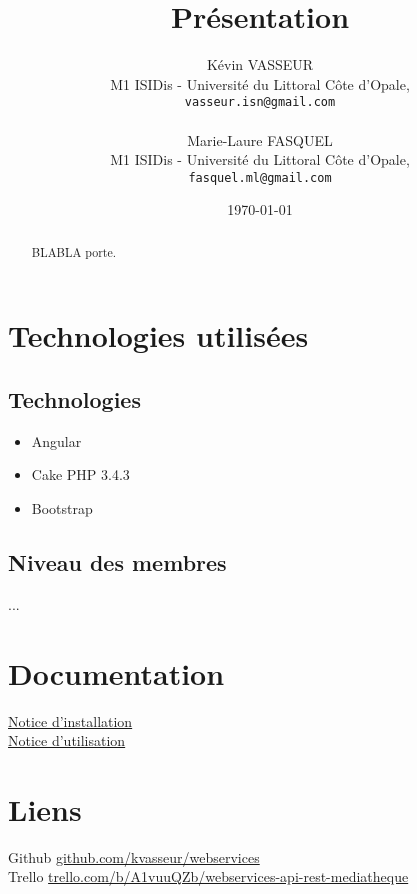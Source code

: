 \documentclass{article}
\title{Pr\'{e}sentation}
\author{K\'{e}vin VASSEUR\\
   M1 ISIDis - Universit\'{e} du Littoral C\^{o}te d'Opale,\\
   \texttt{vasseur.isn@gmail.com}\\
   \\
   Marie-Laure FASQUEL\\
   M1 ISIDis - Universit\'{e} du Littoral C\^{o}te d'Opale,\\
   \texttt{fasquel.ml@gmail.com}
}
\date{\today}
\begin{document}
	\maketitle
	\begin{abstract}
		BLABLA porte.
	\end{abstract}	
	\section{Technologies utilis\'{e}es}
		\subsection{Technologies}
			\begin{itemize}
				\item Angular
				\item Cake PHP 3.4.3
				\item Bootstrap
			\end{itemize}
			
		\subsection{Niveau des membres}
		...
	
	\section{Documentation}
	\href{https://github.com/kvasseur/webservices/blob/master/Documentation/Installation/Notice_d_installation.pdf}{Notice d'installation}
	\\
	\href{https://github.com/kvasseur/webservices/blob/master/Documentation/Utilisation/Notice_d_utilisation.pdf}{Notice d'utilisation}
		
	\section{Liens}
	Github \href{https://github.com/kvasseur/webservices}{github.com/kvasseur/webservices} \\
	Trello \href{https://trello.com/b/A1vuuQZb/webservices-api-rest-mediatheque}{trello.com/b/A1vuuQZb/webservices-api-rest-mediatheque}
	
\end{document}
